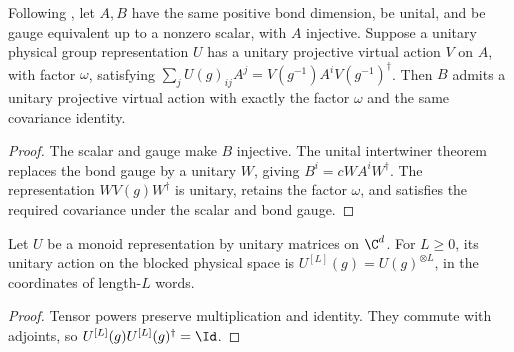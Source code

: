 \begin{lemma}
    \label{thm:spc_aux_unitary_gauge_virtual_transport}
    \leanok
    Following \cite[Appendix~C, lines~2653--2717]{Schuch2011Phases}, let
    $A,B$ have the same positive bond dimension, be unital, and be
    gauge equivalent up to a nonzero scalar, with $A$ injective.
    Suppose a unitary physical group representation $U$ has a unitary
    projective virtual action $V$ on $A$, with factor $\omega$, satisfying
    $\sum_jU(g)_{ij}A^j=V(g^{-1})A^iV(g^{-1})^\dagger$.
    Then $B$ admits a unitary projective virtual action with exactly the
    factor $\omega$ and the same covariance identity.
\end{lemma}
\begin{proof}\leanok
    The scalar and gauge make $B$ injective. The unital intertwiner theorem
    replaces the bond gauge by a unitary $W$, giving
    $B^i=cWA^iW^\dagger$. The representation $WV(g)W^\dagger$ is unitary,
    retains the factor $\omega$, and satisfies the required covariance
    under the scalar and bond gauge.
\end{proof}

\begin{definition}
    \label{def:spc_aux_block_unitary_action}
    \leanok
    Let $U$ be a monoid representation by unitary matrices on $\C^d$.
    For $L\geq0$, its unitary action on the blocked physical space is
    $U^{[L]}(g)=U(g)^{\otimes L}$, in the coordinates of length-$L$ words.
\end{definition}
\begin{proof}\leanok
    Tensor powers preserve multiplication and identity. They commute with
    adjoints, so $U^{[L]}(g)U^{[L]}(g)^\dagger=\Id$.
\end{proof}

